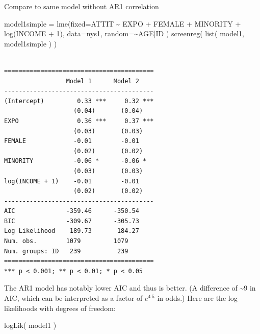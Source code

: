 \documentclass[
  letterpaper,
  DIV=11,
  numbers=noendperiod]{scrreprt}
\newenvironment{Shaded}{\begin{snugshade}}{\end{snugshade}}
\newcommand{\AttributeTok}[1]{\textcolor[rgb]{0.49,0.56,0.16}{#1}}
\newcommand{\DecValTok}[1]{\textcolor[rgb]{0.25,0.63,0.44}{#1}}
\newcommand{\FunctionTok}[1]{\textcolor[rgb]{0.02,0.16,0.49}{#1}}
\newcommand{\NormalTok}[1]{\textcolor[rgb]{0.00,0.44,0.13}{#1}}
\newcommand{\OtherTok}[1]{\textcolor[rgb]{0.00,0.44,0.13}{#1}}
\newcommand{\SpecialCharTok}[1]{\textcolor[rgb]{0.25,0.44,0.63}{#1}}
\begin{document}
Compare to same model without AR1 correlation

\begin{Shaded}
\begin{Highlighting}[]
\NormalTok{model1simple }\OtherTok{=} \FunctionTok{lme}\NormalTok{(}\AttributeTok{fixed=}\NormalTok{ATTIT }\SpecialCharTok{\textasciitilde{}}\NormalTok{ EXPO }\SpecialCharTok{+}\NormalTok{ FEMALE }\SpecialCharTok{+}\NormalTok{ MINORITY }\SpecialCharTok{+} \FunctionTok{log}\NormalTok{(INCOME }\SpecialCharTok{+} \DecValTok{1}\NormalTok{), }
             \AttributeTok{data=}\NormalTok{nys1,}
             \AttributeTok{random=}\SpecialCharTok{\textasciitilde{}}\NormalTok{AGE}\SpecialCharTok{|}\NormalTok{ID )}
\FunctionTok{screenreg}\NormalTok{( }\FunctionTok{list}\NormalTok{( model1, model1simple ) )}
\end{Highlighting}
\end{Shaded}

\begin{verbatim}

=========================================
                 Model 1      Model 2    
-----------------------------------------
(Intercept)         0.33 ***     0.32 ***
                   (0.04)       (0.04)   
EXPO                0.36 ***     0.37 ***
                   (0.03)       (0.03)   
FEMALE             -0.01        -0.01    
                   (0.02)       (0.02)   
MINORITY           -0.06 *      -0.06 *  
                   (0.03)       (0.03)   
log(INCOME + 1)    -0.01        -0.01    
                   (0.02)       (0.02)   
-----------------------------------------
AIC              -359.46      -350.54    
BIC              -309.67      -305.73    
Log Likelihood    189.73       184.27    
Num. obs.        1079         1079       
Num. groups: ID   239          239       
=========================================
*** p < 0.001; ** p < 0.01; * p < 0.05
\end{verbatim}

The AR1 model has notably lower AIC and thus is better. (A difference of
\textasciitilde9 in AIC, which can be interpreted as a factor of
\(e^{4.5}\) in odds.) Here are the log likelihoods with degrees of
freedom:

\begin{Shaded}
\begin{Highlighting}[]
\FunctionTok{logLik}\NormalTok{( model1 )}
\end{Highlighting}
\end{Shaded}
\end{document}
